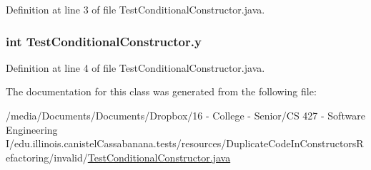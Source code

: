 Definition at line 3 of file TestConditionalConstructor.java.

\hypertarget{classTestConditionalConstructor_a9d4b5fe92fb28e1f6a47420bc248eac3}{
\subsubsection[{y}]{\setlength{\rightskip}{0pt plus 5cm}int {\bf TestConditionalConstructor.y}}}
\label{classTestConditionalConstructor_a9d4b5fe92fb28e1f6a47420bc248eac3}


Definition at line 4 of file TestConditionalConstructor.java.



The documentation for this class was generated from the following file:\begin{DoxyCompactItemize}
\item 
/media/Documents/Documents/Dropbox/16 -\/ College -\/ Senior/CS 427 -\/ Software Engineering I/edu.illinois.canistelCassabanana.tests/resources/DuplicateCodeInConstructorsRefactoring/invalid/\hyperlink{TestConditionalConstructor_8java}{TestConditionalConstructor.java}\end{DoxyCompactItemize}
